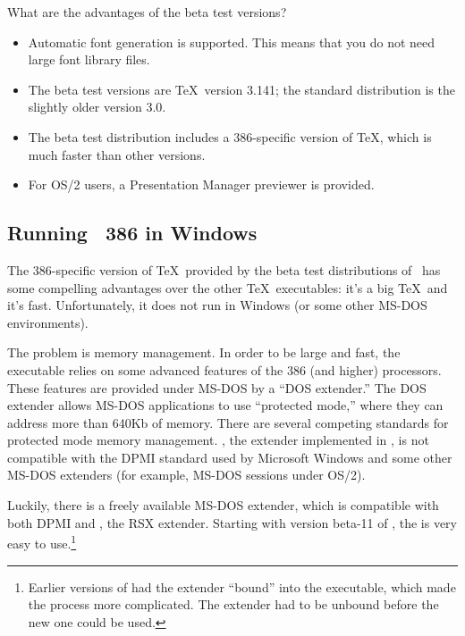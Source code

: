 What are the advantages of the beta test versions?

\begin{itemize}
  \item Automatic font generation is supported.  This means that you do 
        not need large font library files.
  \item The beta test versions are \TeX\ version 3.141; the standard 
        distribution is the slightly older version 3.0.
  \item The beta test distribution includes a 386-specific version of \TeX,
        which is much faster than other versions.
  \item For OS/2 users, a Presentation Manager  previewer is
        provided.
\end{itemize}

\subsection{Running \protect\emTeX\ 386 in Windows}

The 
386-specific version of \TeX\ provided by the beta test distributions
of \emTeX\ has some compelling advantages over the other \TeX\ executables:
it's a big \TeX\ and it's fast.  Unfortunately, it does not
run in Windows (or some other MS-DOS environments).

The problem is memory management.  In order to be large and fast, the
 executable relies on some advanced features of the
386 (and higher) processors. These features are provided under MS-DOS
by a ``DOS extender.''  The DOS extender allows 
MS-DOS applications to
use ``protected mode,'' where they can address more than 640Kb of
memory.  There are several competing standards for protected mode
memory management.  , the extender implemented in
\emTeX, is not compatible with the DPMI standard used by Microsoft
Windows and some other MS-DOS extenders (for example, MS-DOS
sessions under OS/2).

Luckily, there is a freely available MS-DOS extender, which is
compatible with both DPMI and \emTeX, the RSX extender.  Starting with
version beta-11 of \emTeX, the is very easy to
use.\footnote{Earlier versions of  had the
 extender ``bound'' into the executable, which made the
process more complicated.  The  extender had to be
unbound before the new one could be used.}

